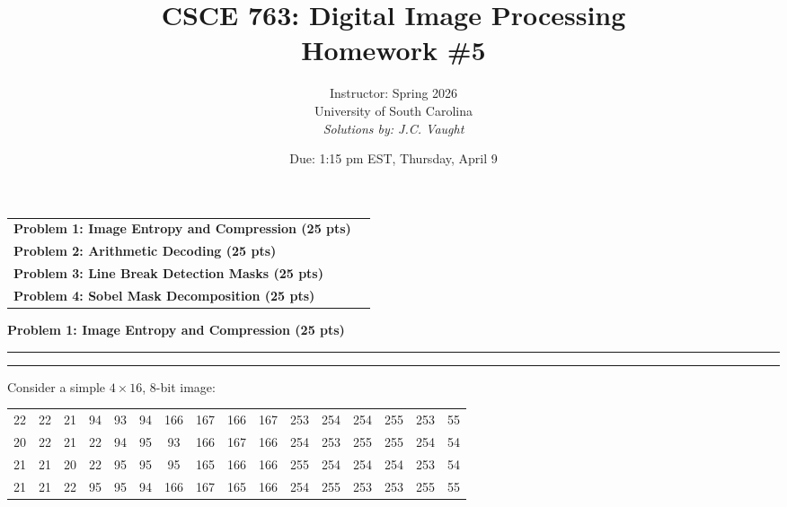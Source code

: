 \documentclass[12pt]{article}
\title{CSCE 763: Digital Image Processing \\ Homework \#5}
\author{Instructor: Spring 2026 \\ University of South Carolina \\ \textit{Solutions by: J.C. Vaught}}
\date{Due: 1:15 pm EST, Thursday, April 9}
\newcommand{\question}[1]{%
  \clearpage
  \vspace{0.5cm}
  {\noindent\normalsize \textbf{#1}}
  \vspace{0.2cm}
  \hrule
  \vspace{0.1cm}
  \hrule
  \vspace{0.3cm}
}
\begin{document}
\maketitle
\setlength{\parindent}{0pt}



\begin{center}
\begin{tcolorbox}[colback=white, colframe=USC_Black90, colbacktitle=USC_Black10,
                  coltitle=USC_Black90, sharp corners, boxrule=1pt,
                  title=\Large\bfseries Table of Contents]
\begin{tabular}{p{}r}
\textbf{Problem 1: Image Entropy and Compression (25 pts)} \dotfill & \textbf{\pageref{quest:1}} \\[0.3em]
\textbf{Problem 2: Arithmetic Decoding (25 pts)} \dotfill & \textbf{\pageref{quest:2}} \\[0.3em]
\textbf{Problem 3: Line Break Detection Masks (25 pts)} \dotfill & \textbf{\pageref{quest:3}} \\[0.3em]
\textbf{Problem 4: Sobel Mask Decomposition (25 pts)} \dotfill & \textbf{\pageref{quest:4}} \\
\end{tabular}
\vspace{0.2cm}
\end{tcolorbox}
\end{center}

\vspace{0.5cm}


\question{Problem 1: Image Entropy and Compression (25 pts)}\label{quest:1}

Consider a simple $4 \times 16$, 8-bit image:

\vspace{0.3cm}

\begin{center}
\ttfamily
\begin{tabular}{cccccccccccccccc}
22 & 22 & 21 & 94 & 93 & 94 & 166 & 167 & 166 & 167 & 253 & 254 & 254 & 255 & 253 & 55 \\
20 & 22 & 21 & 22 & 94 & 95 & 93 & 166 & 167 & 166 & 254 & 253 & 255 & 255 & 254 & 54 \\
21 & 21 & 20 & 22 & 95 & 95 & 95 & 165 & 166 & 166 & 255 & 254 & 254 & 254 & 253 & 54 \\
21 & 21 & 22 & 95 & 95 & 94 & 166 & 167 & 165 & 166 & 254 & 255 & 253 & 253 & 255 & 55 \\
\end{tabular}
\end{center}
\rmfamily
\end{document}
